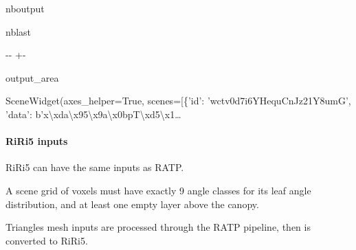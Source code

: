 \documentclass[letterpaper,10pt,english]{sphinxmanual}
\begin{document}
\begin{sphinxuseclass}{nboutput}
\begin{sphinxuseclass}{nblast}
{

\kern-\sphinxverbatimsmallskipamount\kern-\baselineskip
\kern+\FrameHeightAdjust\kern-\fboxrule
\vspace{\nbsphinxcodecellspacing}

\begin{sphinxuseclass}{output_area}
\begin{sphinxuseclass}{}


\begin{sphinxVerbatim}[commandchars=\\\{\}]
\llap{\color{nbsphinxout}[21]:\,\hspace{\fboxrule}\hspace{\fboxsep}}SceneWidget(axes\_helper=True, scenes=[\{'id': 'wctv0d7i6YHequCnJz21Y8umG', 'data': b'x\textbackslash{}xda\textbackslash{}x95\textbackslash{}x9a\textbackslash{}x0bpT\textbackslash{}xd5\textbackslash{}x1…
\end{sphinxVerbatim}



\end{sphinxuseclass}
\end{sphinxuseclass}
}

\end{sphinxuseclass}
\end{sphinxuseclass}

\paragraph{RiRi5 inputs}
\label{\detokenize{input_scenes:RiRi5-inputs}}
\sphinxAtStartPar
RiRi5 can have the same inputs as RATP.

\sphinxAtStartPar
A scene grid of voxels must have exactly 9 angle classes for its leaf angle distribution, and at least one empty layer above the canopy.

\sphinxAtStartPar
Triangles mesh inputs are processed through the RATP pipeline, then is converted to RiRi5.
\end{document}
